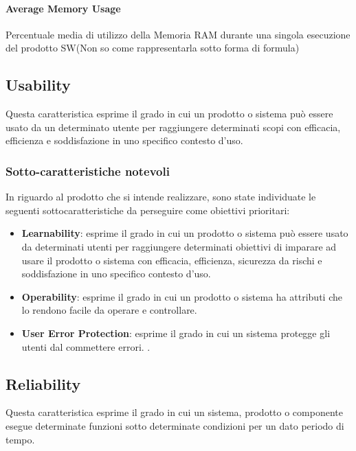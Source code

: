 \paragraph{Average Memory Usage}
\begin{flushleft}
Percentuale media di utilizzo della Memoria RAM durante una singola esecuzione del prodotto SW(Non so come rappresentarla sotto forma di formula)
\end{flushleft}

\subsection{Usability}
Questa caratteristica esprime il grado in cui un prodotto o sistema può essere usato da un determinato utente per raggiungere determinati scopi con efficacia, efficienza e soddisfazione in uno specifico contesto d'uso.
\subsubsection{Sotto-caratteristiche notevoli}
In riguardo al prodotto che si intende realizzare, sono state individuate le seguenti sottocaratteristiche da perseguire come obiettivi prioritari:
\begin{itemize}
	\item{\textbf{Learnability}}: esprime il grado in cui un prodotto o sistema può essere usato da determinati utenti per raggiungere determinati obiettivi di imparare ad usare il prodotto o sistema  con efficacia, efficienza, sicurezza da rischi e soddisfazione in uno specifico contesto d'uso.
	\item{\textbf{Operability}}: esprime il grado in cui un prodotto o sistema ha attributi che lo rendono facile da operare e controllare.
	\item{\textbf{User Error Protection}}: esprime il grado in cui un sistema protegge gli utenti dal commettere errori.
	.
\end{itemize}

\subsection{Reliability}
Questa caratteristica esprime il grado in cui un sistema, prodotto o componente esegue determinate funzioni sotto determinate condizioni per un dato periodo di tempo.

